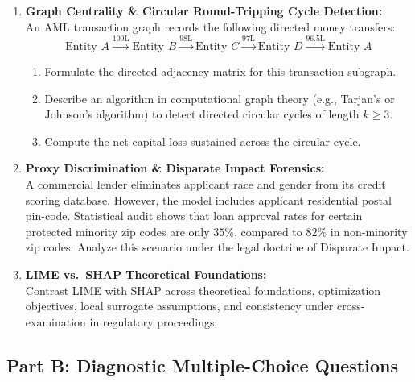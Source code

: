 \begin{enumerate}[label=\textbf{P12.\arabic*}]
    \item \textbf{Graph Centrality \& Circular Round-Tripping Cycle Detection:}\\
    An AML transaction graph records the following directed money transfers:
    \begin{equation*}
    \text{Entity } A \xrightarrow{100\text{L}} \text{Entity } B \xrightarrow{98\text{L}} \text{Entity } C \xrightarrow{97\text{L}} \text{Entity } D \xrightarrow{96.5\text{L}} \text{Entity } A
    \end{equation*}
    \begin{enumerate}[label=(\alph*)]
        \item Formulate the directed adjacency matrix for this transaction subgraph.
        \item Describe an algorithm in computational graph theory (e.g., Tarjan's or Johnson's algorithm) to detect directed circular cycles of length $k \ge 3$.
        \item Compute the net capital loss sustained across the circular cycle.
    \end{enumerate}

    \item \textbf{Proxy Discrimination \& Disparate Impact Forensics:}\\
    A commercial lender eliminates applicant race and gender from its credit scoring database. However, the model includes applicant residential postal pin-code. Statistical audit shows that loan approval rates for certain protected minority zip codes are only $35\%$, compared to $82\%$ in non-minority zip codes. Analyze this scenario under the legal doctrine of Disparate Impact.

    \item \textbf{LIME vs.~SHAP Theoretical Foundations:}\\
    Contrast LIME with SHAP across theoretical foundations, optimization objectives, local surrogate assumptions, and consistency under cross-examination in regulatory proceedings.
\end{enumerate}

\subsection*{Part B: Diagnostic Multiple-Choice Questions}

